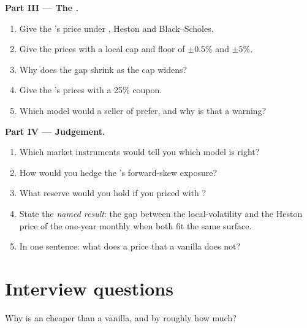 \begin{problem}
\medskip\noindent\textbf{Part III --- The .}
\begin{enumerate}[resume]
\item Give the 's price under , Heston and Black--Scholes.
\item Give the prices with a local cap and floor of $\pm0.5\%$ and $\pm5\%$.
\item Why does the gap shrink as the cap widens?
\item Give the 's prices with a 25\% coupon.
\item Which model would a seller of  prefer, and why is that a warning?
\end{enumerate}

\medskip\noindent\textbf{Part IV --- Judgement.}
\begin{enumerate}[resume]
\item Which market instruments would tell you which model is right?
\item How would you hedge the 's forward-skew exposure?
\item What reserve would you hold if you priced with ?
\item State the \emph{named result}: the gap between the local-volatility and the Heston price of the one-year monthly
 when both fit the same surface.
\item In one sentence: what does a  price that a vanilla does not?
\end{enumerate}
\end{problem}

\section{Interview questions}

\begin{interviewq}\label{iq:dv:asians-lookbacks-cliquets-and-forward-starts:1}
Why is an  cheaper than a vanilla, and by roughly how much?
\end{interviewq}

